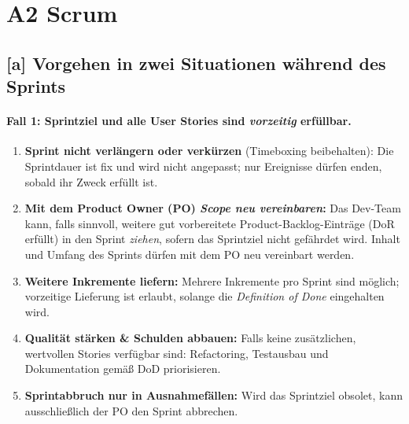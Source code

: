 \documentclass[12pt]{article}
\begin{document}
\section*{A2 Scrum}

\subsection*{[a] Vorgehen in zwei Situationen während des Sprints}

\paragraph{Fall 1: Sprintziel und alle User Stories sind \emph{vorzeitig} erfüllbar.}
\begin{enumerate}
  \item \textbf{Sprint nicht verlängern oder verkürzen} (Timeboxing beibehalten): Die Sprintdauer ist fix und wird nicht angepasst; nur Ereignisse dürfen enden, sobald ihr Zweck erfüllt ist.
  \item \textbf{Mit dem Product Owner (PO) \emph{Scope neu vereinbaren}:} Das Dev-Team kann, falls sinnvoll, weitere gut vorbereitete Product-Backlog-Einträge (DoR erfüllt) in den Sprint \emph{ziehen}, sofern das Sprintziel nicht gefährdet wird. Inhalt und Umfang des Sprints dürfen mit dem PO neu vereinbart werden.
  \item \textbf{Weitere Inkremente liefern:} Mehrere Inkremente pro Sprint sind möglich; vorzeitige Lieferung ist erlaubt, solange die \emph{Definition of Done} eingehalten wird.
  \item \textbf{Qualität stärken \& Schulden abbauen:} Falls keine zusätzlichen, wertvollen Stories verfügbar sind: Refactoring, Testausbau und Dokumentation gemäß DoD priorisieren.
  \item \textbf{Sprintabbruch nur in Ausnahmefällen:} Wird das Sprintziel obsolet, kann ausschließlich der PO den Sprint abbrechen.
\end{enumerate}
\end{document}
